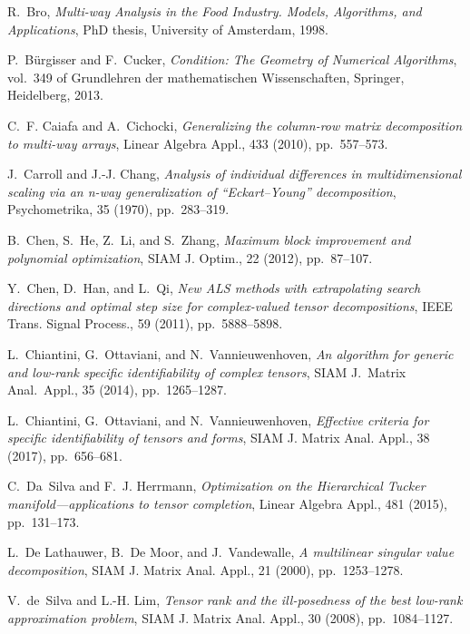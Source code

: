 \documentclass[a4paper,10pt,final]{siamart1116}
\numberwithin{equation}{section}
\numberwithin{figure}{section}
\numberwithin{table}{section}
\numberwithin{theorem}{section}
\begin{document}
\begin{thebibliography}{10}
{\sc R.~Bro}, {\em {Multi-way Analysis in the Food Industry. Models,
  Algorithms, and Applications}}, PhD thesis, University of Amsterdam, 1998.

{\sc P.~B{\"u}rgisser and F.~Cucker}, {\em {Condition: The Geometry of
  Numerical Algorithms}}, vol.~349 of Grundlehren der mathematischen
  Wissenschaften, Springer, Heidelberg, 2013.

{\sc C.~F. Caiafa and A.~Cichocki}, {\em Generalizing the column-row matrix
  decomposition to multi-way arrays}, Linear Algebra Appl., 433 (2010),
  pp.~557--573.

{\sc J.~Carroll and J.-J. Chang}, {\em Analysis of individual differences in
  multidimensional scaling via an n-way generalization of ``{Eckart--Young}''
  decomposition}, Psychometrika, 35 (1970), pp.~283--319.

{\sc B.~Chen, S.~He, Z.~Li, and S.~Zhang}, {\em Maximum block improvement and
  polynomial optimization}, SIAM J. Optim., 22 (2012), pp.~87--107.

{\sc Y.~Chen, D.~Han, and L.~Qi}, {\em New {ALS} methods with extrapolating
  search directions and optimal step size for complex-valued tensor
  decompositions}, IEEE Trans. Signal Process., 59 (2011), pp.~5888--5898.

{\sc L.~Chiantini, G.~Ottaviani, and N.~Vannieuwenhoven}, {\em An algorithm for
  generic and low-rank specific identifiability of complex tensors}, SIAM
  J.~Matrix Anal.~Appl., 35 (2014), pp.~1265--1287.

{\sc L.~Chiantini, G.~Ottaviani, and N.~Vannieuwenhoven}, {\em Effective
  criteria for specific identifiability of tensors and forms}, SIAM J. Matrix
  Anal. Appl., 38 (2017), pp.~656--681.

{\sc C.~Da~Silva and F.~J. Herrmann}, {\em Optimization on the {Hierarchical
  Tucker} manifold---applications to tensor completion}, Linear Algebra Appl.,
  481 (2015), pp.~131--173.

{\sc L.~{De Lathauwer}, B.~{De Moor}, and J.~Vandewalle}, {\em A multilinear
  singular value decomposition}, SIAM J. Matrix Anal. Appl., 21 (2000),
  pp.~1253--1278.

{\sc V.~de~Silva and L.-H. Lim}, {\em Tensor rank and the ill-posedness of the
  best low-rank approximation problem}, SIAM J. Matrix Anal. Appl., 30 (2008),
  pp.~1084--1127.


\end{thebibliography}
\end{document}
